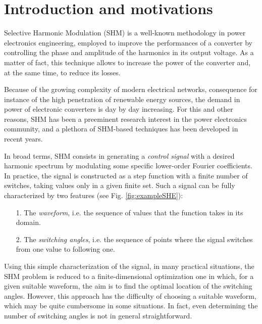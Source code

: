 \documentclass[twocolumn]{autart}    %
\begin{document}
\begin{frontmatter}
\end{frontmatter}

\section{Introduction and motivations}\label{Section1}

Selective Harmonic Modulation (SHM) \cite{Sun1992,Sun1996} is a well-known methodology in power electronics engineering, employed to improve the performances of a converter by controlling the phase and amplitude of the harmonics in its output voltage. As a matter of fact, this technique allows to increase the power of the converter and, at the same time, to reduce its losses. 

Because of the growing complexity of modern electrical networks, consequence for instance of the high penetration of renewable energy sources, the demand in power of electronic converters is day by day increasing. For this and other reasons, SHM has been a preeminent research interest in the power electronics community, and a plethora of SHM-based techniques has been developed in recent years. 

In broad terms, SHM consists in generating a \textit{control signal} with a desired harmonic spectrum by modulating some specific lower-order Fourier coefficients. In practice, the signal is constructed as a step function with a finite number of switches, taking values only in a given finite set. Such a signal can be fully characterized by two features (see Fig. \ref{fig:exampleSHE}): 
\begin{itemize}
	\item[1.] The \textit{waveform}, i.e. the sequence of values that the function takes in its domain.
	\item[2.] The \textit{switching angles}, i.e. the sequence of points where the signal switches from one value to following one. 
\end{itemize}

Using this simple characterization of the signal, in many practical situations, the SHM problem is reduced to a finite-dimensional optimization one in which, for a given suitable waveform, the aim is to find the optimal location of the switching angles. However, this approach has the  difficulty of choosing a suitable waveform,  which may be quite cumbersome in some situations.  In fact, even determining the number of switching angles is not in general straightforward. 
 
\end{document}
